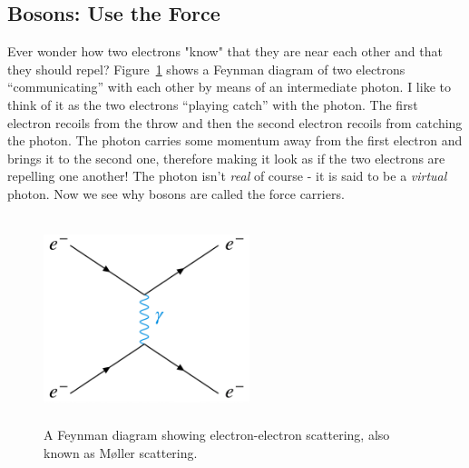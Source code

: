 \subsection{Bosons: Use the Force}
Ever wonder how two electrons "know" that they are near each other and that they should repel? 
Figure~\ref{fig:ee_scattering} shows a Feynman diagram of two electrons ``communicating'' with each other by means of an intermediate photon.
I like to think of it as the two electrons ``playing catch'' with the photon.
The first electron recoils from the throw and then the second electron recoils from catching the photon.
The photon carries some momentum away from the first electron and brings it to the second one, therefore making it look as if the two electrons are repelling one another!
The photon isn't \emph{real} of course - it is said to be a \emph{virtual} photon.
Now we see why bosons are called the force carriers.
\begin{figure}[pbth]
\centering
\includegraphics[width=6cm,height=6cm,keepaspectratio]{figures/sm/ee_scattering_Moeller.png}
    \caption{A Feynman diagram showing electron-electron scattering, also known as Møller scattering.} 
    \label{fig:ee_scattering}
\end{figure}

